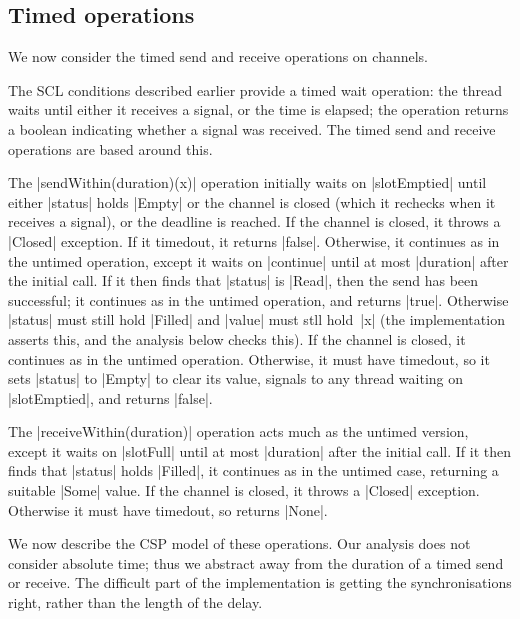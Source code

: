 
\subsection{Timed operations}
\label{sec:syncchan-timed}

\inlineScala

We now consider the timed send and receive operations on channels.  

The SCL conditions described earlier provide a timed wait operation: the
thread waits until either it receives a signal, or the time is elapsed; the
operation returns a boolean indicating whether a signal was received.  The
timed send and receive operations are based around this. 

The |sendWithin(duration)(x)| operation initially waits on |slotEmptied| until
either |status| holds |Empty| or the channel is closed (which it rechecks when
it receives a signal), or the deadline is reached.  If the channel is closed,
it throws a |Closed| exception.  If it timedout, it returns |false|.
Otherwise, it continues as in the untimed operation, except it waits on
|continue| until at most |duration| after the initial call.  If it then finds
that |status| is |Read|, then the send has been successful; it continues as in
the untimed operation, and returns |true|.  Otherwise |status| must still hold
|Filled| and |value| must stll hold~|x| (the implementation asserts this, and
the analysis below checks this).  If the channel is closed, it continues as in
the untimed operation.  Otherwise, it must have timedout, so it sets |status|
to |Empty| to clear its value, signals to any thread waiting on |slotEmptied|,
and returns |false|.

The |receiveWithin(duration)| operation acts much as the untimed version,
except it waits on |slotFull| until at most |duration| after the initial
call.  If it then finds that |status| holds |Filled|, it continues as in the
untimed case, returning a suitable |Some| value.  If the channel is closed, it
throws a |Closed| exception.  Otherwise it must have timedout, so returns
|None|.  


We now describe the CSP model of these operations.  Our analysis does not
consider absolute time; thus we abstract away from the duration of a timed
send or receive.  The difficult part of the implementation is getting the
synchronisations right, rather than the length of the delay. 

